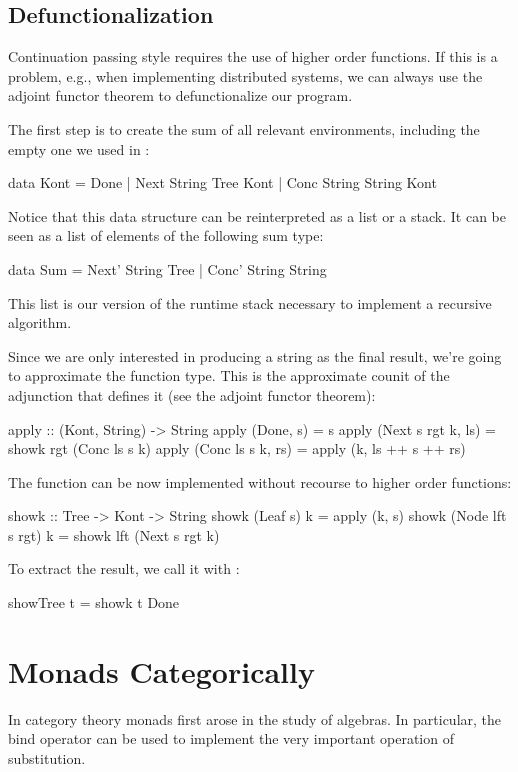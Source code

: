 \documentclass[DaoFP]{subfiles}
\begin{document}
\subsection{Defunctionalization}

Continuation passing style requires the use of higher order functions. If this is a problem, e.g., when implementing distributed systems, we can always use the adjoint functor theorem to defunctionalize our program. 

The first step is to create the sum of all relevant environments, including the empty one we used in :
\begin{haskell}
data Kont = Done 
          | Next String Tree Kont 
          | Conc String String Kont
\end{haskell}
Notice that this data structure can be reinterpreted as a list or a stack. It can be seen as a list of elements of the following sum type:
\begin{haskell}
data Sum = Next' String Tree  | Conc' String String 
\end{haskell}
This list is our version of the runtime stack necessary to implement a recursive algorithm. 

Since we are only interested in producing a string as the final result, we're going to approximate the  function type. This is the approximate counit of the adjunction that defines it (see the adjoint functor theorem):
\begin{haskell}
apply :: (Kont, String) -> String
apply (Done, s) = s
apply (Next s rgt k, ls) = showk rgt (Conc ls s k)
apply (Conc ls s k, rs) = apply (k, ls ++ s ++ rs)
\end{haskell}

The  function can be now implemented without recourse to higher order functions:
\begin{haskell}
showk :: Tree -> Kont -> String
showk (Leaf s) k = apply (k, s)
showk (Node lft s rgt) k = showk lft (Next s rgt k)
\end{haskell}
To extract the result, we call it with :
\begin{haskell}
showTree t = showk t Done
\end{haskell}

\section{Monads Categorically}

In category theory monads first arose in the study of algebras. In particular, the bind operator can be used to implement the very important operation of substitution. 
\end{document}
